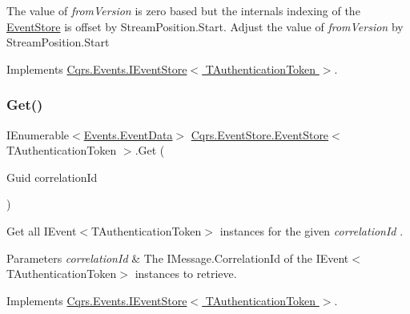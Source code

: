 The value of {\itshape from\+Version}  is zero based but the internals indexing of the \hyperlink{classCqrs_1_1EventStore_1_1EventStore}{Event\+Store} is offset by Stream\+Position.\+Start. Adjust the value of {\itshape from\+Version}  by Stream\+Position.\+Start 

Implements \hyperlink{interfaceCqrs_1_1Events_1_1IEventStore_ae02ef6c804d0c4a92705a447bc4b2214_ae02ef6c804d0c4a92705a447bc4b2214}{Cqrs.\+Events.\+I\+Event\+Store$<$ T\+Authentication\+Token $>$}.

\mbox{\label{classCqrs_1_1EventStore_1_1EventStore_a898b51899af27db8aa0fb0c0dc75b25d_a898b51899af27db8aa0fb0c0dc75b25d}} 
\subsubsection{\texorpdfstring{Get()}{Get()}\hspace{0.1cm}{\footnotesize\ttfamily [2/2]}}
{\footnotesize\ttfamily I\+Enumerable$<$\hyperlink{classCqrs_1_1Events_1_1EventData}{Events.\+Event\+Data}$>$ \hyperlink{classCqrs_1_1EventStore_1_1EventStore}{Cqrs.\+Event\+Store.\+Event\+Store}$<$ T\+Authentication\+Token $>$.Get (\begin{DoxyParamCaption}\item[{Guid}]{correlation\+Id }\end{DoxyParamCaption})}



Get all I\+Event$<$\+T\+Authentication\+Token$>$ instances for the given {\itshape correlation\+Id} . 


\begin{DoxyParams}{Parameters}
{\em correlation\+Id} & The I\+Message.\+Correlation\+Id of the I\+Event$<$\+T\+Authentication\+Token$>$ instances to retrieve.\\
\hline
\end{DoxyParams}


Implements \hyperlink{interfaceCqrs_1_1Events_1_1IEventStore_af398bb6768fa661ad97a9fa9ecfbd9fb_af398bb6768fa661ad97a9fa9ecfbd9fb}{Cqrs.\+Events.\+I\+Event\+Store$<$ T\+Authentication\+Token $>$}.

\mbox{\label{classCqrs_1_1EventStore_1_1EventStore_aaa4ebd61c84124425380ce31e3a67600_aaa4ebd61c84124425380ce31e3a67600}} 
